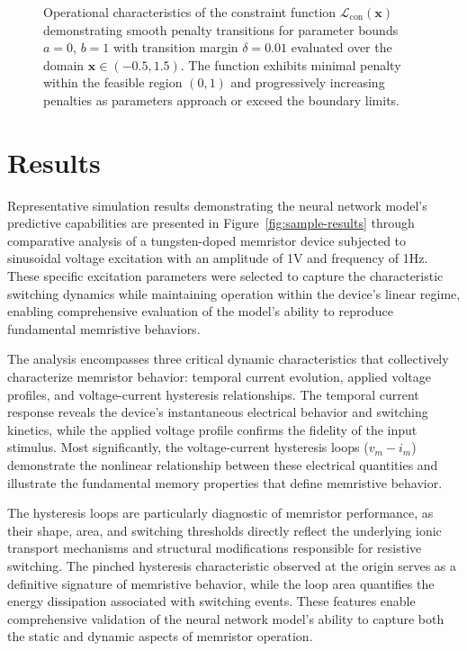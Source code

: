 \documentclass[11pt, oneside]{article}
\begin{document}
\begin{figure}[H]
    \centering
    \resizebox{0.5\linewidth}{!}{%
        
    }
    \caption{Operational characteristics of the constraint function $\mathcal{L}_{\mathrm{con}}(\mathbf{x})$ demonstrating smooth penalty transitions for parameter bounds $a=0$, $b=1$ with transition margin $\delta=0.01$ evaluated over the domain $\mathbf{x} \in (-0.5, 1.5)$. The function exhibits minimal penalty within the feasible region $(0,1)$ and progressively increasing penalties as parameters approach or exceed the boundary limits.}
    \label{fig:constrains}
\end{figure}





\section{Results}

Representative simulation results demonstrating the neural network model's predictive capabilities are presented in Figure~\ref{fig:sample-results} through comparative analysis of a tungsten-doped memristor device subjected to sinusoidal voltage excitation with an amplitude of 1V and frequency of 1Hz. These specific excitation parameters were selected to capture the characteristic switching dynamics while maintaining operation within the device's linear regime, enabling comprehensive evaluation of the model's ability to reproduce fundamental memristive behaviors.

The analysis encompasses three critical dynamic characteristics that collectively characterize memristor behavior: temporal current evolution, applied voltage profiles, and voltage-current hysteresis relationships. The temporal current response reveals the device's instantaneous electrical behavior and switching kinetics, while the applied voltage profile confirms the fidelity of the input stimulus. Most significantly, the voltage-current hysteresis loops ($v_m - i_m$) demonstrate the nonlinear relationship between these electrical quantities and illustrate the fundamental memory properties that define memristive behavior.

The hysteresis loops are particularly diagnostic of memristor performance, as their shape, area, and switching thresholds directly reflect the underlying ionic transport mechanisms and structural modifications responsible for resistive switching. The pinched hysteresis characteristic observed at the origin serves as a definitive signature of memristive behavior, while the loop area quantifies the energy dissipation associated with switching events. These features enable comprehensive validation of the neural network model's ability to capture both the static and dynamic aspects of memristor operation.
\end{document}
